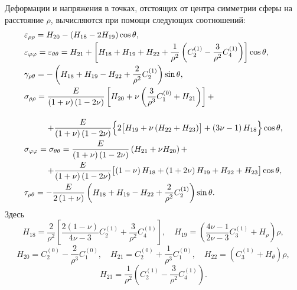 Деформации и напряжения в точках, отстоящих от центра симметрии
сферы на расстояние $\rho $, вычисляются при помощи следующих соотношений:
$$
\begin{array}{l}
\varepsilon _{\rho \rho } = H_{20} - \left( {H_{18} - 2H_{19} } \right)\cos\theta , 
\vspace{1mm} 
\\
\displaystyle
\varepsilon _{\varphi \varphi } = \varepsilon _{\theta \theta } =
H_{21} + \left[ {H_{18} + H_{19} + H_{22} + \frac{1}{\rho ^2}\left(
{C_2^{(1)} - \frac{3}{\rho ^2}C_4^{(1)} }
\right)} \right]\cos \theta , 
\vspace{1mm} 
\\
\displaystyle
\gamma _{\rho \theta } = - \left( {H_{18} + H_{19} - H_{22} +
\frac{2}{\rho ^2}C_2^{(1)} } \right)\sin \theta ,
\vspace{1mm} 
\\
\displaystyle
 \sigma _{\rho \rho } = \frac{E}{\left( {1 + \nu } \right)\left( {1 - 2\nu }
\right)}\left[ {H_{20} + \nu \left( {\frac{3}{\rho ^3}C_1^{\left( 0
\right)}
+ H_{21} } \right)} \right] + \\
\vspace{1mm} 
\\
\displaystyle \hspace{1cm} + \frac{E}{\left( {1 + \nu } \right)\left( {1 - 2\nu } \right)}\Bigl\{
{2\bigl[ {H_{19} + \nu \left( {H_{22} + H_{23} } \right)} \bigr] +
\left( {3\nu - 1} \right)H_{18} } \Bigr\}\cos \theta ,
\vspace{1mm} 
\\
\displaystyle
 \sigma _{\varphi \varphi } = \sigma _{\theta \theta } = \frac{E}{\left( {1 + \nu
} \right)\left( {1 - 2\nu } \right)}\left( {H_{21} + \nu H_{20} }
\right) +
\vspace{1mm} 
\\
\displaystyle
\hspace{1cm}
 + \frac{E}{\left( {1 + \nu } \right)\left( {1 - 2\nu } \right)}\bigl[
{\left( {1 - \nu } \right)H_{18} + \left( {1 + 2\nu } \right)H_{19}
+ H_{22} + H_{23} } \bigr]\cos \theta ,
\vspace{1mm} 
\\
\displaystyle
\tau _{\rho \theta } = - \frac{E}{2\left( {1 + \nu } \right)}\left(
{H_{18} + H_{19} - H_{22} + \frac{2}{\rho ^2}C_2^{(1)}
} \right)\sin \theta .
\end{array}
$$
\noindent Здесь
$$ H_{18} = \frac{2}{\rho ^2}\left[ {\frac{2\left( {1 - \nu } \right)}{4\nu -
3}C_2^{(1)} + \frac{3}{\rho ^2}C_4^{(1)} }
\right], \quad H_{19} = \left( {\frac{4\nu - 1}{2\nu - 3}C_3^{\left(
1 \right)} + H_\rho } \right)\rho ,
$$
$$
H_{20} = C_2^{(0)} - \frac{2}{\rho ^3}C_1^{\left( 0
\right)} , \quad H_{21} = C_2^{(0)} + \frac{1}{\rho
^3}C_1^{(0)} , \quad H_{22} = \left( {C_3^{\left( 1
\right)} + H_\theta } \right)\rho ,
$$
$$
H_{23} = \frac{1}{\rho ^2}\left( {C_2^{(1)} -
\frac{3}{\rho ^2}C_4^{(1)} } \right).
$$

